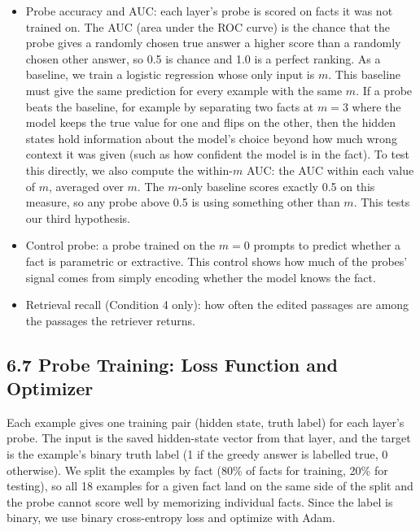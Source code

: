 \documentclass[
  12pt,
  letterpaper,
]{article}
\begin{document}
\begin{itemize}
  truth-support rate drops below 50\%, reported
  separately for the parametric and extractive
  groups. Comparing the two flip points tests our
  second hypothesis.
\item
  Probe accuracy and AUC: each layer's probe is
  scored on facts it was not trained on. The AUC
  (area under the ROC curve) is the chance that
  the probe gives a randomly chosen true answer a
  higher score than a randomly chosen other
  answer, so 0.5 is chance and 1.0 is a perfect
  ranking. As a baseline, we train a logistic
  regression whose only input is \(m\). This
  baseline must give the same prediction for every
  example with the same \(m\). If a probe beats
  the baseline, for example by separating two
  facts at \(m = 3\) where the model keeps the
  true value for one and flips on the other, then
  the hidden states hold information about the
  model's choice beyond how much wrong context it
  was given (such as how confident the model is in
  the fact). To test this directly, we also
  compute the within-\(m\) AUC: the AUC within
  each value of \(m\), averaged over \(m\). The
  \(m\)-only baseline scores exactly 0.5 on this
  measure, so any probe above 0.5 is using
  something other than \(m\). This tests our third
  hypothesis.
\item
  Control probe: a probe trained on the \(m = 0\)
  prompts to predict whether a fact is parametric
  or extractive. This control shows how much of
  the probes' signal comes from simply encoding
  whether the model knows the fact.
\item
  Retrieval recall (Condition 4 only): how often
  the edited passages are among the passages the
  retriever returns.
\end{itemize}

\subsection{6.7 Probe Training: Loss Function and
Optimizer}\label{probe-training-loss-function-and-optimizer}

Each example gives one training pair (hidden
state, truth label) for each layer's probe. The
input is the saved hidden-state vector from that
layer, and the target is the example's binary
truth label (1 if the greedy answer is labelled
true, 0 otherwise). We split the examples by fact
(80\% of facts for training, 20\% for testing), so
all 18 examples for a given fact land on the same
side of the split and the probe cannot score well
by memorizing individual facts. Since the label is
binary, we use binary cross-entropy loss and
optimize with Adam.
\end{document}
